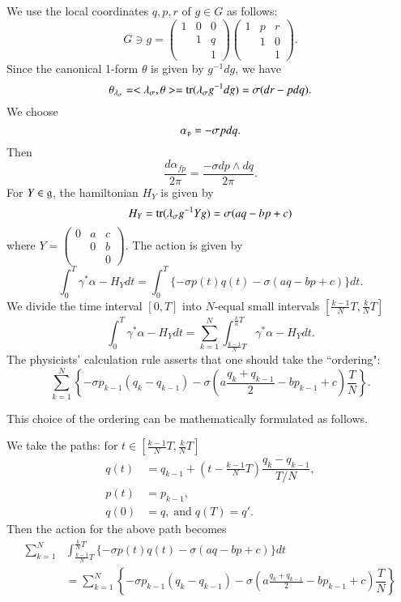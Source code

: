  We use the local coordinates $q, p,r $ of $g \in G$ as follows:
 $$
 G \ni g = \begin{pmatrix}
1 & 0 & 0\\
 & 1 & q\\
  & & 1
 \end{pmatrix}
\begin{pmatrix}
1 & p & r\\
 & 1 & 0\\
  & & 1
 \end{pmatrix}.
$$
Since the canonical 1-form $\theta$ is given by $g^{-1}dg$, we have
$$
\theta_{\lambda_{\sigma}}= < \lambda_{\sigma}, \theta> ={\rm tr}(\lambda_{\sigma} g^{-1}dg)= \sigma(dr-pdq).
$$
We choose
$$
\alpha_{\mathfrak{p}}= -\sigma pdq.
$$
Then
$$
\dfrac{d\alpha_{fp}}{2 \pi} = \dfrac{-\sigma dp \wedge dq}{2\pi}.
$$
For $Y \in \mathfrak{g}$, the hamiltonian $H_{Y}$ is given by
$$
H_{Y} = {\rm tr}(\lambda_{\sigma} g^{-1} Y g)= \sigma(aq-bp + c)
$$
where $Y = \begin{pmatrix}
0 & a & c\\
  & 0 & b\\
  &   & 0
\end{pmatrix}.
$ The action is given by
$$
\int_{0}^{T}\gamma^{*}\alpha-H_{Y}dt = \int_{0}^{T}\{-\sigma p(t)q(t)-\sigma(aq-bp + c)\}dt.
$$
We divide the time interval $[0,T]$ into $N$-equal small intervals $\left[\frac{k-1}{N}T,  \frac{k}{N}T\right]$
$$
\int_{0}^{T} \gamma^{*}\alpha-H_{Y}dt = \sum\limits_{k=1}^{N}\int_{\frac{k-1}{N}T}^{\frac{k}{n}T} \gamma^{*}\alpha-H_{Y}dt.
$$
The physicists' calculation rule asserts that one should take the ``ordering":
$$
\sum\limits_{k=1}^{N}\left\{-\sigma p_{k-1}(q_{k}-q_{k-1})-\sigma(a \frac{q_{k}+q_{k-1}}{2}-bp_{k-1} + c)\frac{T}{N} \right\}.
$$

This choice of the ordering can be mathematically formulated as follows.

We take the paths: for $t \in \left[\frac{k-1}{N}T, \frac{k}{N}T\right]$
\begin{align*}
q(t)&=q_{k-1}+(t-\frac{k-1}{N}T)\dfrac{q_{k}-q_{k-1}}{T/N},\\
p(t)&= p_{k-1},\\
q(0)&= q, \; \text{and} \; q(T)=q'.
\end{align*}
Then the action for the above path becomes
\begin{equation*}
\begin{split}
\sum\limits_{k=1}^{N}&\int_{\frac{k-1}{N}T}^{\frac{k}{N}T} \{-\sigma p(t)q(t)-\sigma(aq-bp +c)\}dt\\
  &= \sum\limits_{k=1}^{N}\left\{-\sigma p_{k-1}(q_{k}-q_{k-1})-\sigma(a \frac{q_{k}+q_{k-1}}{2}-bp_{k-1}+c)\dfrac{T}{N} \right\}
\end{split}
\end{equation*}

